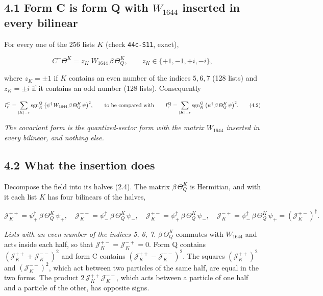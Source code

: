 \documentclass[
  10pt,
]{article}
\begin{document}
\hypertarget{form-c-is-form-q-with-w_1644-inserted-in-every-bilinear}{%
\subsection{\texorpdfstring{4.1 Form C is form Q with \(W_{1644}\)
inserted in every
bilinear}{4.1 Form C is form Q with W\_\{1644\} inserted in every bilinear}}\label{form-c-is-form-q-with-w_1644-inserted-in-every-bilinear}}

For every one of the 256 lists \(K\) (check \texttt{44c-S11}, exact),

\[C^-\Theta^K=z_K\;W_{1644}\,\beta\,\Theta_Q^K,\qquad z_K\in\{+1,-1,+i,-i\},\tag{4.1}\]

where \(z_K=\pm1\) if \(K\) contains an even number of the indices
\(5,6,7\) (128 lists) and \(z_K=\pm i\) if it contains an odd number
(128 lists). Consequently

\[I_r^{\rm C}=\sum_{|K|=r}\mathrm{sgn}^Q_K\,\big(\psi^\dagger\,W_{1644}\,\beta\,\Theta_Q^K\,\psi\big)^2,
\qquad\text{to be compared with}\qquad
I_r^{\rm Q}=\sum_{|K|=r}\mathrm{sgn}^Q_K\,\big(\psi^\dagger\,\beta\,\Theta_Q^K\,\psi\big)^2.\tag{4.2}\]

\emph{The covariant form is the quantized-sector form with the matrix
\(W_{1644}\) inserted in every bilinear, and nothing else.}

\hypertarget{what-the-insertion-does}{%
\subsection{4.2 What the insertion does}\label{what-the-insertion-does}}

Decompose the field into its halves (2.4). The matrix
\(\beta\,\Theta_Q^K\) is Hermitian, and with it each list \(K\) has four
bilinears of the halves,

\[\mathcal J_K^{++}=\psi_+^\dagger\,\beta\,\Theta_Q^K\,\psi_+,\quad
\mathcal J_K^{--}=\psi_-^\dagger\,\beta\,\Theta_Q^K\,\psi_-,\quad
\mathcal J_K^{+-}=\psi_+^\dagger\,\beta\,\Theta_Q^K\,\psi_-,\quad
\mathcal J_K^{-+}=\psi_-^\dagger\,\beta\,\Theta_Q^K\,\psi_+=(\mathcal J_K^{+-})^\dagger.\]

\emph{Lists with an even number of the indices 5, 6, 7.}
\(\beta\,\Theta_Q^K\) commutes with \(W_{1644}\) and acts inside each
half, so that \(\mathcal J_K^{+-}=\mathcal J_K^{-+}=0\). Form Q contains
\((\mathcal J_K^{++}+\mathcal J_K^{--})^2\) and form C contains
\((\mathcal J_K^{++}-\mathcal J_K^{--})^2\). The squares
\((\mathcal J_K^{++})^2\) and \((\mathcal J_K^{--})^2\), which act
between two particles of the same half, are equal in the two forms. The
product \(2\,\mathcal J_K^{++}\mathcal J_K^{--}\), which acts between a
particle of one half and a particle of the other, has opposite signs.
\end{document}
